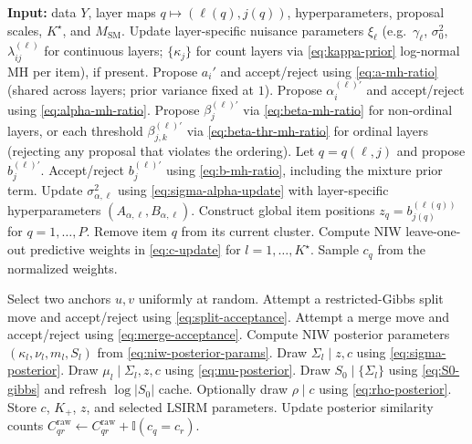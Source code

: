 \documentclass[11pt]{article}
\newcommand{\ind}{\mathbb I}
\begin{document}
\begin{algorithm}[H]
\caption{One MCMC sweep: LSIRM update and collapsed label update}
\small
\begin{algorithmic}[1]
\State \textbf{Input:} data $Y$, layer maps $q\mapsto(\ell(q),j(q))$, hyperparameters, proposal scales, $K^\star$, and $M_{\mathrm{SM}}$.
\State Update layer-specific nuisance parameters $\xi_\ell$ (e.g.\ $\gamma_\ell$, $\sigma_0^2$, $\lambda_{ij}^{(\ell)}$ for continuous layers; $\{\kappa_j\}$ for count layers via \eqref{eq:kappa-prior} log-normal MH per item), if present.
    \State Propose $a_i'$ and accept/reject using \eqref{eq:a-mh-ratio} (shared across layers; prior variance fixed at $1$).
\EndFor
{}
        \State Propose $\alpha_i^{(\ell)\prime}$ and accept/reject using \eqref{eq:alpha-mh-ratio}.
    \EndFor
        \State Propose $\beta_j^{(\ell)\prime}$ via \eqref{eq:beta-mh-ratio} for non-ordinal layers, or each threshold $\beta_{j,k}^{(\ell)\prime}$ via \eqref{eq:beta-thr-mh-ratio} for ordinal layers (rejecting any proposal that violates the ordering).
        \State Let $q=q(\ell,j)$ and propose $b_j^{(\ell)\prime}$.
        \State Accept/reject $b_j^{(\ell)\prime}$ using \eqref{eq:b-mh-ratio}, including the mixture prior term.
    \EndFor
    \State Update $\sigma_{\alpha,\ell}^2$ using \eqref{eq:sigma-alpha-update} with layer-specific hyperparameters $(A_{\alpha,\ell},B_{\alpha,\ell})$.
\EndFor
\State Construct global item positions $z_q=b_{j(q)}^{(\ell(q))}$ for $q=1,\dots,P$.
    \State Remove item $q$ from its current cluster.
    \State Compute NIW leave-one-out predictive weights in \eqref{eq:c-update} for $l=1,\dots,K^\star$.
    \State Sample $c_q$ from the normalized weights.
\EndFor
\end{algorithmic}
\end{algorithm}

\begin{algorithm}[H]
\caption{One MCMC sweep: split--merge, mixture-parameter update, and storage}
\small
\begin{algorithmic}[1]
    \State Select two anchors $u,v$ uniformly at random.
        \State Attempt a restricted-Gibbs split move and accept/reject using \eqref{eq:split-acceptance}.
    \Else
        \State Attempt a merge move and accept/reject using \eqref{eq:merge-acceptance}.
    \EndIf
\EndFor
{}
    \State Compute NIW posterior parameters $(\kappa_l,\nu_l,m_l,S_l)$ from \eqref{eq:niw-posterior-params}.
    \State Draw $\Sigma_l\mid z,c$ using \eqref{eq:sigma-posterior}.
    \State Draw $\mu_l\mid \Sigma_l,z,c$ using \eqref{eq:mu-posterior}.
\EndFor
\State Draw $S_0\mid\{\Sigma_l\}$ using \eqref{eq:S0-gibbs} and refresh $\log|S_0|$ cache.
\State Optionally draw $\rho\mid c$ using \eqref{eq:rho-posterior}.
    \State Store $c$, $K_+$, $z$, and selected LSIRM parameters.
    \State Update posterior similarity counts $C_{qr}^{\mathrm{raw}}\leftarrow C_{qr}^{\mathrm{raw}}+\ind(c_q=c_r)$.
\EndIf
\end{algorithmic}
\end{algorithm}
\end{document}
